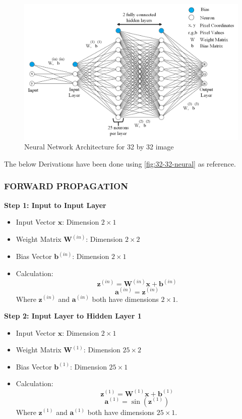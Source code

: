\documentclass{ioereport}
\begin{document}
\begin{figure}[H]
    \centering
    \includegraphics[width=\linewidth]{assets/32_32_neural.png}
    \caption{Neural Network Architecture for 32 by 32 image}
    \label{fig:32-32-neural}
\end{figure}

The below Derivations have been done using \autoref{fig:32-32-neural} as reference.
\subsubsection*{\MakeUppercase{Forward Propagation}}
\textbf{Step 1: Input to Input Layer}
\begin{itemize}
  \item Input Vector $\mathbf{x}$: Dimension $2 \times 1$
  \item Weight Matrix $\mathbf{W}^{(in)}$: Dimension $2 \times 2$
  \item Bias Vector $\mathbf{b}^{(in)}$: Dimension $2 \times 1$
  \item Calculation:
  \[
  \mathbf{z}^{(in)} = \mathbf{W}^{(in)} \mathbf{x} + \mathbf{b}^{(in)}
  \]
  \[
  \mathbf{a}^{(in)} = \mathbf{z}^{(in)}
  \]
  Where $\mathbf{z}^{(in)}$ and $\mathbf{a}^{(in)}$ both have dimensions $2 \times 1$.
\end{itemize}


\textbf{Step 2: Input Layer to Hidden Layer 1}
\begin{itemize}
  \item Input Vector $\mathbf{x}$: Dimension $2 \times 1$
  \item Weight Matrix $\mathbf{W}^{(1)}$: Dimension $25 \times 2$
  \item Bias Vector $\mathbf{b}^{(1)}$: Dimension $25 \times 1$
  \item Calculation:
  \[
  \mathbf{z}^{(1)} = \mathbf{W}^{(1)} \mathbf{x} + \mathbf{b}^{(1)}
  \]
  \[
  \mathbf{a}^{(1)} = \sin(\mathbf{z}^{(1)})
  \]
  Where $\mathbf{z}^{(1)}$ and $\mathbf{a}^{(1)}$ both have dimensions $25 \times 1$.
\end{itemize}
\end{document}
